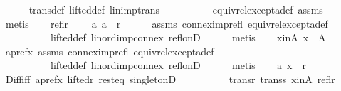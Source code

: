 \begin{isabellebody}
\ \ \ \ \isamarkupfalse%
\ trans{\isacharunderscore}{\kern0pt}def\ lifted{\isacharunderscore}{\kern0pt}def\ lin{\isacharunderscore}{\kern0pt}imp{\isacharunderscore}{\kern0pt}trans\isanewline
\ \ \ \ \ \ \ \ \ \ equiv{\isacharunderscore}{\kern0pt}rel{\isacharunderscore}{\kern0pt}except{\isacharunderscore}{\kern0pt}a{\isacharunderscore}{\kern0pt}def\ assms\isanewline
\ \ \ \ \isamarkupfalse%
\ metis\isanewline
\ \ \isamarkupfalse%
\ refl{\isacharunderscore}{\kern0pt}r{\isacharcolon}{\kern0pt}\isanewline
\ \ \ \ {\isachardoublequoteopen}{\isacharparenleft}{\kern0pt}a{\isacharcomma}{\kern0pt}\ a{\isacharparenright}{\kern0pt}\ {\isasymin}\ r{\isachardoublequoteclose}\isanewline
\ \ \ \ \isamarkupfalse%
\ assms\ connex{\isacharunderscore}{\kern0pt}imp{\isacharunderscore}{\kern0pt}refl\ equiv{\isacharunderscore}{\kern0pt}rel{\isacharunderscore}{\kern0pt}except{\isacharunderscore}{\kern0pt}a{\isacharunderscore}{\kern0pt}def\isanewline
\ \ \ \ \ \ \ \ \ \ lifted{\isacharunderscore}{\kern0pt}def\ lin{\isacharunderscore}{\kern0pt}ord{\isacharunderscore}{\kern0pt}imp{\isacharunderscore}{\kern0pt}connex\ refl{\isacharunderscore}{\kern0pt}onD\isanewline
\ \ \ \ \isamarkupfalse%
\ metis\isanewline
\ \ \isamarkupfalse%
\ x{\isacharunderscore}{\kern0pt}in{\isacharunderscore}{\kern0pt}A{\isacharcolon}{\kern0pt}\ {\isachardoublequoteopen}x\ {\isasymin}\ A{\isachardoublequoteclose}\isanewline
\ \ \ \ \isamarkupfalse%
\ a{\isacharunderscore}{\kern0pt}pref{\isacharunderscore}{\kern0pt}x\ assms\ connex{\isacharunderscore}{\kern0pt}imp{\isacharunderscore}{\kern0pt}refl\ equiv{\isacharunderscore}{\kern0pt}rel{\isacharunderscore}{\kern0pt}except{\isacharunderscore}{\kern0pt}a{\isacharunderscore}{\kern0pt}def\isanewline
\ \ \ \ \ \ \ \ \ \ lifted{\isacharunderscore}{\kern0pt}def\ lin{\isacharunderscore}{\kern0pt}ord{\isacharunderscore}{\kern0pt}imp{\isacharunderscore}{\kern0pt}connex\ refl{\isacharunderscore}{\kern0pt}onD{}\isanewline
\ \ \ \ \isamarkupfalse%
\ metis\isanewline
\ \ \isamarkupfalse%
\ {\isachardoublequoteopen}{\isacharparenleft}{\kern0pt}a{\isacharcomma}{\kern0pt}\ x{\isacharparenright}{\kern0pt}\ {\isasymin}\ r{\isachardoublequoteclose}\isanewline
\ \ \ \ \isamarkupfalse%
\ Diff{\isacharunderscore}{\kern0pt}iff\ a{\isacharunderscore}{\kern0pt}pref{\isacharunderscore}{\kern0pt}x\ lifted{\isacharunderscore}{\kern0pt}r\ rest{\isacharunderscore}{\kern0pt}eq\ singletonD\isanewline
\ \ \ \ \ \ \ \ \ \ trans{\isacharunderscore}{\kern0pt}r\ trans{\isacharunderscore}{\kern0pt}s\ x{\isacharunderscore}{\kern0pt}in{\isacharunderscore}{\kern0pt}A\ refl{\isacharunderscore}{\kern0pt}r\isanewline

\end{isabellebody}
